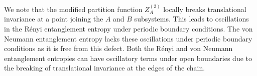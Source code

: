 \documentclass[aps,prb,reprint,floatfix]{revtex4-1}
\begin{document}
We note that the modified partition function $Z^{(2)}_{A}$ locally breaks translational invariance at a point joining the $A$ and $B$ subsystems.\cite{Cardy2010:Unusual}  This leads to oscillations in the R\'{e}nyi entanglement entropy under periodic boundary conditions.  The von Neumann entanglement entropy lacks these oscillations under periodic boundary conditions as it is free from this defect.  Both the R\'{e}nyi and von Neumann entanglement entropies can have oscillatory terms under open boundaries due to the breaking of translational invariance at the edges of the chain.








\end{document}
